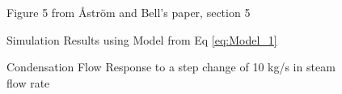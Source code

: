         \begin{figure}[ht]
            \begin{center}
                
                Figure 5 from \r{A}str\"{o}m and Bell's paper, section 5 \cite{Astrom}
                
                
                Simulation Results using Model from Eq \eqref{eq:Model_1}
                
                \caption{Condensation Flow Response to a step change of 10 kg/s in steam flow rate}
                \label{fig:Fig5D}
            \end{center}
        \end{figure}     
            
